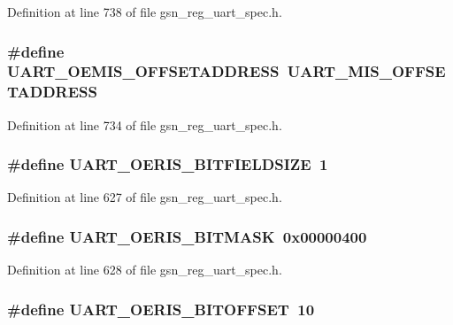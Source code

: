 Definition at line 738 of file gsn\_\-reg\_\-uart\_\-spec.h.

\hypertarget{a00575_a2537e9333bb58d4754b6789d260b9058}{
\subsubsection[{UART\_\-OEMIS\_\-OFFSETADDRESS}]{\setlength{\rightskip}{0pt plus 5cm}\#define UART\_\-OEMIS\_\-OFFSETADDRESS~UART\_\-MIS\_\-OFFSETADDRESS}}
\label{a00575_a2537e9333bb58d4754b6789d260b9058}


Definition at line 734 of file gsn\_\-reg\_\-uart\_\-spec.h.

\hypertarget{a00575_ab6fc94ebc5054ddb3a207229f9905c2b}{
\subsubsection[{UART\_\-OERIS\_\-BITFIELDSIZE}]{\setlength{\rightskip}{0pt plus 5cm}\#define UART\_\-OERIS\_\-BITFIELDSIZE~1}}
\label{a00575_ab6fc94ebc5054ddb3a207229f9905c2b}


Definition at line 627 of file gsn\_\-reg\_\-uart\_\-spec.h.

\hypertarget{a00575_ab16d2c80e49eae0a66441015c90ccece}{
\subsubsection[{UART\_\-OERIS\_\-BITMASK}]{\setlength{\rightskip}{0pt plus 5cm}\#define UART\_\-OERIS\_\-BITMASK~0x00000400}}
\label{a00575_ab16d2c80e49eae0a66441015c90ccece}


Definition at line 628 of file gsn\_\-reg\_\-uart\_\-spec.h.

\hypertarget{a00575_a82b84ac35ede47d592a1aa4d45560c76}{
\subsubsection[{UART\_\-OERIS\_\-BITOFFSET}]{\setlength{\rightskip}{0pt plus 5cm}\#define UART\_\-OERIS\_\-BITOFFSET~10}}
\label{a00575_a82b84ac35ede47d592a1aa4d45560c76}


